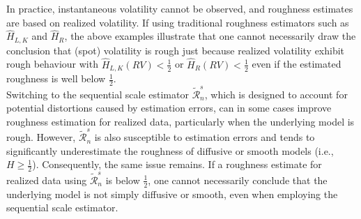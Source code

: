 \documentclass{article}
\begin{document}
In practice, instantaneous volatility cannot be observed, and roughness estimates are based on realized volatility. If using traditional roughness estimators such as $\widehat{H}_{L,K}$ and $\widehat{H}_R$, the above examples illustrate that one cannot necessarily draw the conclusion that (spot) volatility is rough just because realized volatility exhibit rough behaviour with $\widehat{H}_{L,K}(RV)<\frac{1}{2}$ or $\widehat{H}_{R}(RV)<\frac{1}{2}$ even if the estimated roughness is well below $\frac{1}{2}$.\\
Switching to the sequential scale estimator $\widetilde{\mathscr{R}}_n^s$, which is designed to account for potential distortions caused by estimation errors, can in some cases improve roughness estimation for realized data, particularly when the underlying model is rough. However, $\widetilde{\mathscr{R}}_n^s$ is also susceptible to estimation errors and tends to significantly underestimate the roughness of diffusive or smooth models (i.e., $H \geq \frac{1}{2}$). Consequently, the same issue remains. If a roughness estimate for realized data using $\widetilde{\mathscr{R}}_n^s$ is below $\frac{1}{2}$, one cannot necessarily conclude that the underlying model is not simply diffusive or smooth, even when employing the sequential scale estimator.
\end{document}
